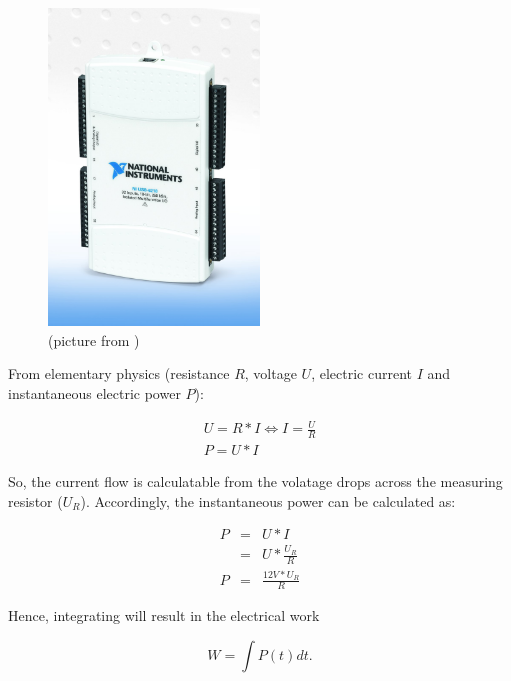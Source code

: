 \begin{figure}
  \centering
    \includegraphics[width=0.5\textwidth]{fig/NI-USB-6218.jpg}
  \caption{\JWPni{} (picture from )}
  \label{fig:ni}
\end{figure}


\label{sec:calc-work}

From elementary physics (resistance $R$, voltage $U$, electric current $I$ and
instantaneous electric power $P$):

\begin{eqnarray}
     U = R * I \iff I = \frac{U}{R} \\
     P = U * I
\end{eqnarray}

So, the current flow is calculatable from the volatage drops across the
measuring resistor ($U_R$). Accordingly, the instantaneous power can be
calculated as:

\begin{eqnarray}
P & = & U * I \\
  & = & U * \frac{U_R}{R} \\
P & = & \frac{12V * U_R}{R}
\end{eqnarray}

Hence, integrating will result in the electrical work

\begin{equation}
  W = \int P(t)dt.
\end{equation}


